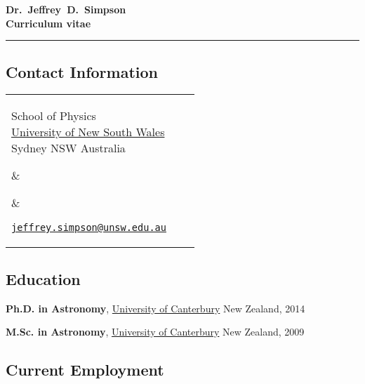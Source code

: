 \documentclass[10pt]{article}
\newcommand{\makeheading}[2][]%
        {\hspace*{-\marginparsep minus \marginparwidth}%
         \begin{minipage}[t]{\textwidth+\marginparwidth+\marginparsep}%
             {\large \bfseries #2 \hfill #1}\\[-0.15\baselineskip]%
                 \rule{\columnwidth}{1pt}%
         \end{minipage}}
\providecommand*\emaillink[1]{\nolinkurl{#1}}
\providecommand*\email[1]{\href{mailto:#1}{\emaillink{#1}}}
\begin{document}
\makeheading{Dr.~Jeffrey~D.~Simpson\\Curriculum vitae}

\subsection*{Contact Information}

%
%
\newlength{\rcollength}\setlength{\rcollength}{2.3in}%
\newlength{\spacewidth}\setlength{\spacewidth}{10pt}
%
\begin{tabular}[t]{@{}p{\textwidth-\rcollength-\spacewidth}@{}p{\spacewidth}@{}p{\rcollength}}%

\parbox{\textwidth-\rcollength-\spacewidth}{%
School of Physics\\
\href{http://www.unsw.edu.au/}{University of New South Wales}\\
Sydney NSW Australia}

&
\parbox[m][5\baselineskip]{\spacewidth}{} &

\parbox{\rcollength}{%
\email{jeffrey.simpson@unsw.edu.au}}
\end{tabular}

\subsection*{Education}

\textbf{Ph.D. in Astronomy},
\href{http://www.canterbury.ac.nz/}{University of Canterbury}
New Zealand,
             \hfill 2014

\textbf{M.Sc. in Astronomy},
\href{http://www.canterbury.ac.nz/}{University of Canterbury}
New Zealand,
             \hfill 2009

\subsection*{Current Employment}
\end{document}
